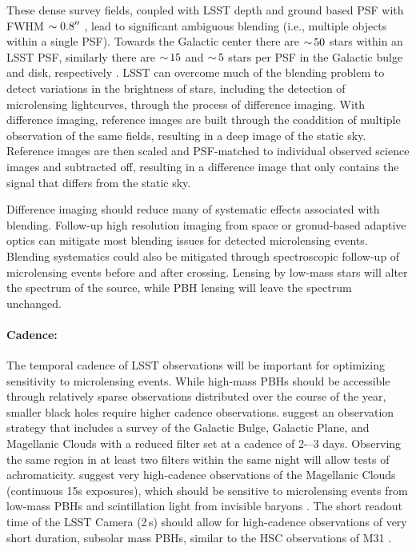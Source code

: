These dense survey fields, coupled with LSST depth and ground based PSF with FWHM $\sim 0.8 ''$ \citep{0805.2366}, lead to significant ambiguous blending (i.e., multiple objects within a single PSF).
Towards the Galactic center there are $ {\sim}\, 50$ stars within an LSST PSF, similarly there are $ {\sim}\, 15$ and $ {\sim}\, 5$ stars per PSF in the Galactic bulge and disk, respectively \citep{1806.06372}.
LSST can overcome much of the blending problem to detect variations in the brightness of stars, including the detection of microlensing lightcurves, through the process of difference imaging.
With difference imaging, reference images are built through the coaddition of multiple observation of the same fields, resulting in a deep image of the static sky. Reference images are then scaled and PSF-matched to individual observed science images and subtracted off, resulting in a difference image that only contains the signal that differs from the static sky. 

Difference imaging should reduce many of systematic effects associated with blending. Follow-up high resolution imaging from space or gronud-based adaptive optics can mitigate most blending issues for detected microlensing events.
Blending systematics could also be mitigated through spectroscopic follow-up of microlensing events before and after crossing. Lensing by low-mass stars will alter the spectrum of the source, while PBH lensing will leave the spectrum unchanged.

\paragraph{Cadence:} The temporal cadence of LSST observations will be important for optimizing sensitivity to microlensing events. 
While high-mass PBHs should be accessible through relatively sparse observations distributed over the course of the year, smaller black holes require higher cadence observations.
\citep{1812.03137} suggest an observation strategy that includes a survey of the Galactic Bulge, Galactic Plane, and Magellanic Clouds with a reduced filter set at a cadence of 2-–3 days. 
Observing the same region in at least two filters within the same night will allow tests of achromaticity.
\citet{1812.03139} suggest very high-cadence observations of the Magellanic Clouds (continuous 15s exposures), which should be sensitive to microlensing events from low-mass PBHs and scintillation light from invisible baryons \citep[\eg][]{2003A&A...412..105M}.
The short readout time of the LSST Camera (2\,s) should allow for high-cadence observations of very short duration, subsolar mass PBHs, similar to the HSC observations of M31 \citep{1701.02151}.

